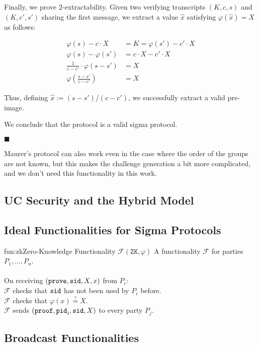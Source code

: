 Finally, we prove $2$-extractability. Given two verifying transcripts
$(K, c, s)$ and $(K, c', s')$ sharing the first message, we extract
a value $\hat{x}$ satisfying $\varphi(\hat{x}) = X$ as follows:

$$
\begin{aligned}
\varphi(s) - c \cdot X &= K = \varphi(s') - c' \cdot X\\
\varphi(s) - \varphi(s') &= c \cdot X - c' \cdot X\\
\frac{1}{c - c'} \cdot \varphi(s - s') &= X\\
\varphi \left(\frac{s - s'}{c - c'}\right) &= X
\end{aligned}
$$

Thus, defining $\hat{x} := (s - s') / (c - c')$, we successfully extract
a valid pre-image.

We conclude that the protocol is a valid sigma protocol.

$\blacksquare$

Maurer's protocol can also work even in the case where the order of
the groups are not known, but this makes the challenge generation
a bit more complicated, and we don't need this functionality in
this work.

\subsection{UC Security and the Hybrid Model}

\subsection{Ideal Functionalities for Sigma Protocols}

\begin{afunctionality}{fun:zk}{Zero-Knowledge Functionality $\mathcal{F}(\texttt{ZK}, \varphi)$}
A functionality $\mathcal{F}$ for parties $P_1, \ldots, P_n$.\\
\\
On receiving $(\texttt{prove}, \texttt{sid}, X, x)$ from $P_i$:\\
$\mathcal{F}$ checks that $\texttt{sid}$ has not been used by $P_i$ before.\\
$\mathcal{F}$ checks that $\varphi(x) \stackrel{?}{=} X$.\\
$\mathcal{F}$ sends $(\texttt{proof}, \texttt{pid}_i, \texttt{sid}, X)$ to every party $P_j$.

\end{afunctionality}

\subsection{Broadcast Functionalities}

